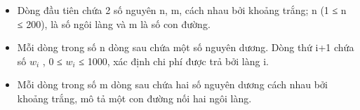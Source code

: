 \begin{itemize}
	\item     Dòng đầu tiên chứa 2 số nguyên n, m, cách nhau bởi khoảng trắng; n (1 ≤ n ≤ 200), là số ngôi làng và m là số con đường.   
	\item     Mỗi dòng trong số n dòng sau chứa một số nguyên dương. Dòng thứ i+1 chứa số $w_{i}$    , 0  ≤  $w_{i}$    ≤ 1000, xác định chi phí được trả bởi làng i.   
	\item     Mỗi dòng trong số m dòng sau chứa hai số nguyên dương cách nhau bởi khoảng trắng, mô tả một con đường nối hai ngôi làng.   
\end{itemize}